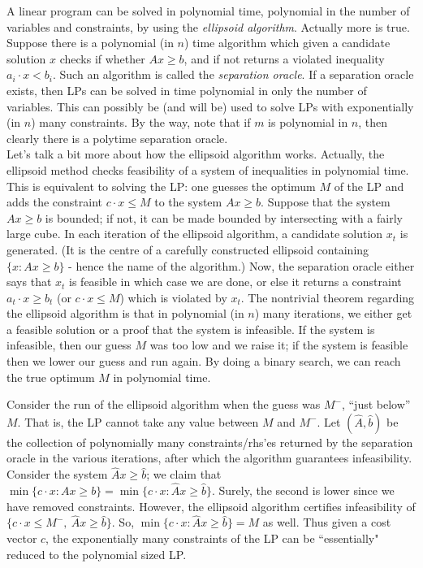 \documentclass[11pt]{article}
\begin{document}
%
A linear program can be solved in polynomial time, polynomial in the number of variables and constraints, by using the {\em ellipsoid algorithm}. Actually more is true. Suppose there is a polynomial (in $n$) time algorithm which given a candidate solution $x$ checks if whether $Ax\ge b$, and if not returns a violated inequality $a_i\cdot x < b_i$.
Such an algorithm is called the {\em separation oracle}. If a separation oracle exists, then LPs can be solved 
in time polynomial in only the number of variables. 
This can possibly be (and will be) used to solve LPs 
with exponentially (in $n$) many constraints. By the way, note that if $m$ is polynomial in $n$, then clearly there is a polytime separation oracle. \\

\noindent
Let's talk a bit more about how the ellipsoid algorithm works. Actually, the ellipsoid method checks feasibility of a system of inequalities in polynomial time. This is equivalent to solving the LP: one 
guesses the optimum $M$ of the LP and adds the constraint $c\cdot x \le M$ to the system $Ax\ge b$. 
Suppose that the system $Ax\ge b$ is bounded; if not, it can be made bounded by intersecting with a fairly large cube. In each iteration of the ellipsoid algorithm, a candidate solution $x_t$ is generated. 
(It is the centre of a carefully constructed ellipsoid containing $\{x:Ax\ge b\}$ - hence the name of the algorithm.) Now, the separation oracle either says that $x_t$ is feasible in which case we are done, or else it returns a constraint $a_t\cdot x\ge b_t$ (or $c\cdot x \le M$) which is violated by $x_t$. 
The nontrivial theorem regarding the ellipsoid algorithm is that in polynomial (in $n$) many iterations, we either get a feasible solution or a proof that the system is infeasible. If the system is infeasible, then our guess $M$ was too low and we raise it; if the system is feasible then we lower our guess and run again. By doing a binary search, we can reach the true optimum $M$ in polynomial time. 

\def\A{\hat{A}}
\def\b{\hat{b}}
Consider the run of the ellipsoid algorithm when the guess was $M^{-}$, ``just below'' $M$.
That is, the LP cannot take any value between $M$ and $M^{-}$.
Let $(\A,\b)$ be the collection of polynomially many constraints/rhs'es returned by the separation oracle in the various iterations,
after which the algorithm guarantees infeasibility.
Consider the system $\A x\ge \b$; we claim that $\min\{c\cdot x: Ax\ge b\} = \min\{c\cdot x: \A x\ge \b\}$.
Surely, the second is lower since we have removed constraints. However, the ellipsoid algorithm certifies infeasibility of $\{c\cdot x\le M^{-}, ~ \A x \ge \b\}$. So, $\min\{c\cdot x: \A x\ge \b\} = M$ as well.
Thus given a cost vector $c$, the exponentially many constraints of the LP can be ``essentially" reduced to the polynomial sized LP. \\
\end{document}

